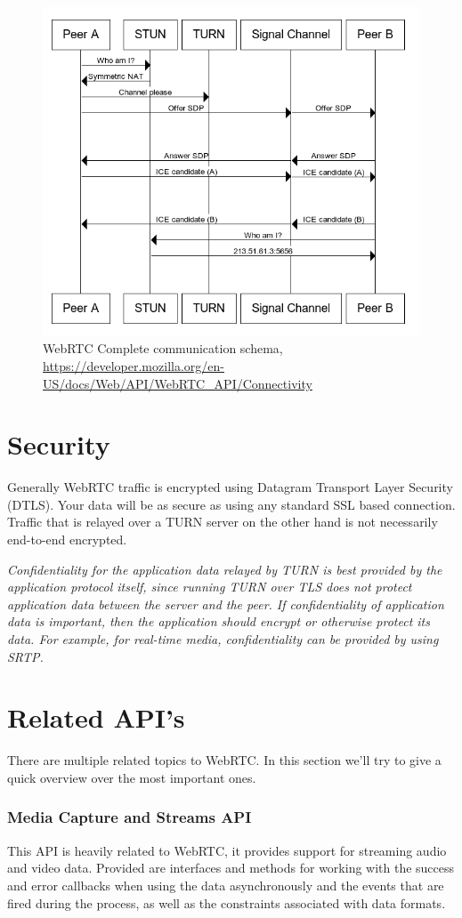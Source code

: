 \begin{figure}[H]
	\includegraphics[scale=0.5]{images/webrtc-complete-diagram.png}
	\centering
	\caption{WebRTC Complete communication schema, \url{https://developer.mozilla.org/en-US/docs/Web/API/WebRTC_API/Connectivity}}
	\label{fig:WebRTC}
\end{figure}

\section{Security}
Generally WebRTC traffic is encrypted using Datagram Transport Layer Security (DTLS). Your data will be as secure as using any standard SSL based connection. Traffic that is relayed over a TURN server on the other hand is not necessarily end-to-end encrypted.

\textit{Confidentiality for the application data relayed by TURN is best provided by the application protocol itself, since running TURN over TLS does not protect application data between the server and the peer. If confidentiality of application data is important, then the application should encrypt or otherwise protect its data. For example, for real-time media, confidentiality can be provided by using SRTP.}~\cite{TURN:sec}

\section{Related API's}
There are multiple related topics to WebRTC. In this section we'll try to give a quick overview over the most important ones.

\subsubsection{Media Capture and Streams API}
This API is heavily related to WebRTC, it provides support for streaming audio and video data. Provided are interfaces and methods for working with the success and error callbacks when using the data asynchronously and the events that are fired during the process, as well as the constraints associated with data formats.